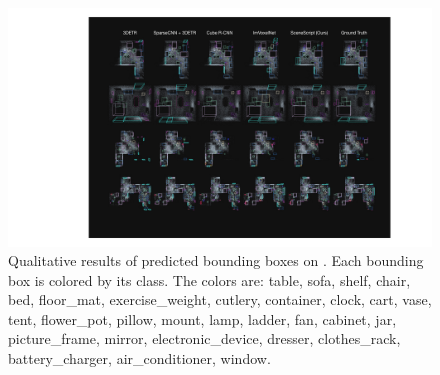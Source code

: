 \begin{figure}[t]
    \centering
    \includegraphics[width=\columnwidth]{figs/ase_bbox_qualitative_compressed.pdf}
    \caption{Qualitative results of predicted bounding boxes on \DatasetName{}. Each bounding box is colored by its class. The colors are: \textcolor{table_bbox_color}{table}, \textcolor{sofa_bbox_color}{sofa}, \textcolor{shelf_bbox_color}{shelf}, \textcolor{chair_bbox_color}{chair}, \textcolor{bed_bbox_color}{bed}, \textcolor{floor_mat_bbox_color}{floor\_mat}, \textcolor{exercise_weight_bbox_color}{exercise\_weight}, \textcolor{cutlery_bbox_color}{cutlery}, \textcolor{container_bbox_color}{container}, \textcolor{clock_bbox_color}{clock}, \textcolor{cart_bbox_color}{cart}, \textcolor{vase_bbox_color}{vase}, \textcolor{tent_bbox_color}{tent}, \textcolor{flower_pot_bbox_color}{flower\_pot}, \textcolor{pillow_bbox_color}{pillow}, \textcolor{mount_bbox_color}{mount}, \textcolor{lamp_bbox_color}{lamp}, \textcolor{ladder_bbox_color}{ladder}, \textcolor{fan_bbox_color}{fan}, \textcolor{cabinet_bbox_color}{cabinet}, \textcolor{jar_bbox_color}{jar}, \textcolor{picture_frame_bbox_color}{picture\_frame}, \textcolor{mirror_bbox_color}{mirror}, \textcolor{electronic_device_bbox_color}{electronic\_device}, \textcolor{dresser_bbox_color}{dresser}, \textcolor{clothes_rack_bbox_color}{clothes\_rack}, \textcolor{battery_charger_bbox_color}{battery\_charger}, \textcolor{air_conditioner_bbox_color}{air\_conditioner}, \textcolor{window_bbox_color}{window}.}
    \label{fig:ase_bbox_qualitative}
\end{figure}

